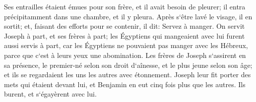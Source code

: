 \verse Ses entrailles étaient émues pour son frère, et il avait besoin de pleurer; il entra précipitamment dans une chambre, et il y pleura. 
\verse Après s`être lavé le visage, il en sortit; et, faisant des efforts pour se contenir, il dit: Servez à manger. 
\verse On servit Joseph à part, et ses frères à part; les Égyptiens qui mangeaient avec lui furent aussi servis à part, car les Égyptiens ne pouvaient pas manger avec les Hébreux, parce que c`est à leurs yeux une abomination. 
\verse Les frères de Joseph s`assirent en sa présence, le premier-né selon son droit d`aînesse, et le plus jeune selon son âge; et ils se regardaient les uns les autres avec étonnement. 
\verse Joseph leur fit porter des mets qui étaient devant lui, et Benjamin en eut cinq fois plus que les autres. Ils burent, et s`égayèrent avec lui. 

\chapter{}


